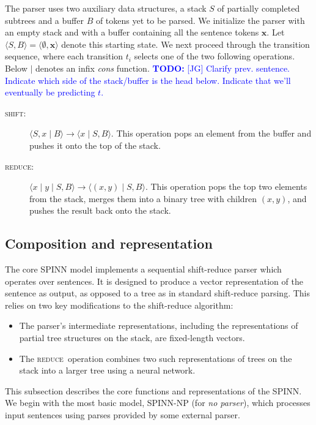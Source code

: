 \documentclass[11pt]{article}
\newcommand\todo[1]{\textcolor{blue}{\textbf{TODO:} #1}}
\newcommand{\shift}{\textsc{shift}}
\newcommand{\reduce}{\textsc{reduce}}
\begin{document}
The parser uses two auxiliary data structures, a stack $S$ of partially completed subtrees and a buffer $B$ of tokens yet to be parsed. We initialize the parser with an empty stack and with a buffer containing all the sentence tokens $\mathbf x$. Let $\langle S, B \rangle = \langle \emptyset, \mathbf x \rangle$ denote this starting state. We next proceed through the transition sequence, where each transition $t_i$ selects one of the two following operations. Below $\mid$ denotes an infix \textit{cons} function. \todo{[JG] Clarify prev. sentence. Indicate which side of the stack/buffer is the head below. Indicate that we'll eventually be predicting $t$.}
\begin{description}
  \item[\shift:] $\langle S, x \mid B \rangle \to \langle x \mid S, B \rangle$. This operation pops an element from the buffer and pushes it onto the top of the stack.
  \item[\reduce:] $\langle x \mid y \mid S, B \rangle \to \langle (x, y) \mid S, B \rangle$. This operation pops the top two elements from the stack, merges them into a binary tree with children $(x, y)$, and pushes the result back onto the stack.
\end{description}

\subsection{Composition and representation}

The core SPINN model implements a sequential shift-reduce parser which operates over sentences. It is designed to produce a vector representation of the sentence as output, as opposed to a tree as in standard shift-reduce parsing. This relies on two key modifications to the shift-reduce algorithm:
\begin{itemize}
\item The parser's intermediate representations, including the representations of partial tree structures on the stack, are fixed-length vectors.
\item The \reduce~operation combines two such representations of trees on the stack into a larger tree using a neural network.
\end{itemize}

This subsection describes the core functions and representations of the SPINN. We begin with the most basic model, SPINN-NP (for \textit{no parser}), which processes input sentences using parses provided by some external parser.
\end{document}

